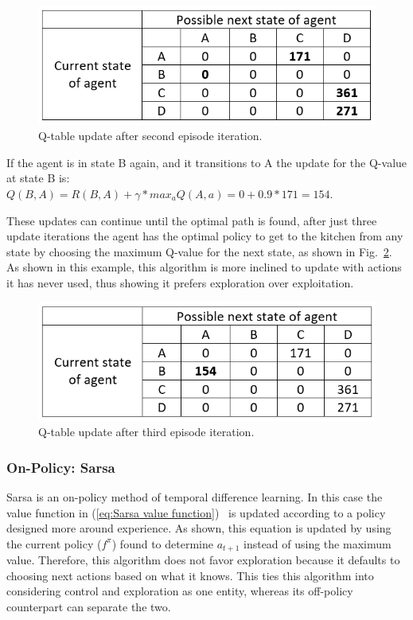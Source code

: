 \documentclass[12pt,american]{report}
\begin{document}
\begin{figure}
\centering
\includegraphics[scale=1]{images/q-table-update-2.png}
\caption{Q-table update after second episode iteration.}
\label{fig:q-table-update-2}
\end{figure}
If the agent is in state B again, and it transitions to A the update for the Q-value at state B is: \\
$Q(B,A) = R(B,A) + \gamma*max_a Q(A,a) = 0 + 0.9*171 = 154$.

These updates can continue until the optimal path is found, after just three update iterations the agent has the optimal policy to get to the kitchen from any state by choosing the maximum Q-value for the next state, as shown in Fig.~\ref{fig:q-table-update-3}. As shown in this example, this algorithm is more inclined to update with actions it has never used, thus showing it prefers exploration over exploitation.
\begin{figure}
\centering
\includegraphics[scale=1]{images/q-table-update-3.png}
\caption{Q-table update after third episode iteration.}
\label{fig:q-table-update-3}
\end{figure}

        
        \subsubsection{On-Policy: Sarsa}
        Sarsa is an on-policy method of temporal difference learning. In this case the value function in (\ref{eq:Sarsa value function})~\cite{sprague2003multiple} is updated according to a policy designed more around experience. As shown, this equation is updated by using the current policy ($f^{\pi}$) found to determine $a_{t+1}$ instead of using the maximum value.  Therefore, this algorithm does not favor exploration because it defaults to choosing next actions based on what it knows. This ties this algorithm into considering control and exploration as one entity, whereas its off-policy counterpart can separate the two.
        
\end{document}
